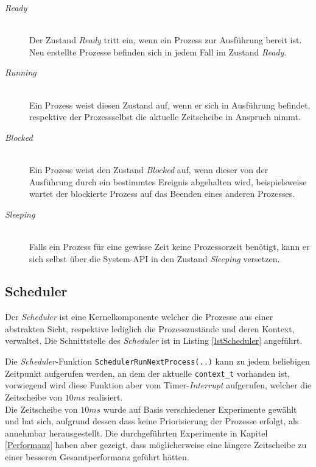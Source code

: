 \begin{description}
	\item[\textit{Ready}] \hfill \\
	Der Zustand \textit{Ready} tritt ein, wenn ein Prozess zur Ausführung bereit ist. Neu erstellte Prozesse befinden sich in jedem Fall im Zustand \textit{Ready}.
	
	\item[\textit{Running}] \hfill \\
	Ein Prozess weist diesen Zustand auf, wenn er sich in Ausführung befindet, respektive der Prozessselbst die aktuelle Zeitscheibe in Anspruch nimmt.
	
	\item[\textit{Blocked}] \hfill \\
	Ein Prozess weist den Zustand \textit{Blocked} auf, wenn dieser von der Ausführung durch ein bestimmtes Ereignis abgehalten wird, beispielsweise wartet der blockierte Prozess auf das Beenden eines anderen Prozesses.
	
	\item[\textit{Sleeping}] \hfill \\
	Falls ein Prozess für eine gewisse Zeit keine Prozessorzeit benötigt, kann er sich selbst über die System-API in den Zustand \textit{Sleeping} versetzen.

\end{description}

\subsection{Scheduler}
\label{secScheduler}
Der \textit{Scheduler} ist eine Kernelkomponente welcher die Prozesse aus einer abstrakten Sicht, respektive lediglich die Prozesszustände und deren Kontext, verwaltet. Die Schnittstelle des \textit{Scheduler} ist in Listing \ref{lstScheduler} angeführt.



Die \textit{Scheduler}-Funktion \texttt{SchedulerRunNextProcess(..)} kann zu jedem beliebigen Zeitpunkt aufgerufen werden, an dem der aktuelle \texttt{context\_t} vorhanden ist, vorwiegend wird diese Funktion aber vom Timer-\textit{Interrupt} aufgerufen, welcher die Zeitscheibe von $10ms$ realisiert.\\
Die Zeitscheibe von $10ms$ wurde auf Basis verschiedener Experimente gewählt und hat sich, aufgrund dessen dass keine Priorisierung der Prozesse erfolgt, als annehmbar herausgestellt. Die durchgeführten Experimente in Kapitel \ref{Performanz} haben aber gezeigt, dass möglicherweise eine längere Zeitscheibe zu einer besseren Gesamtperformanz geführt hätten.

